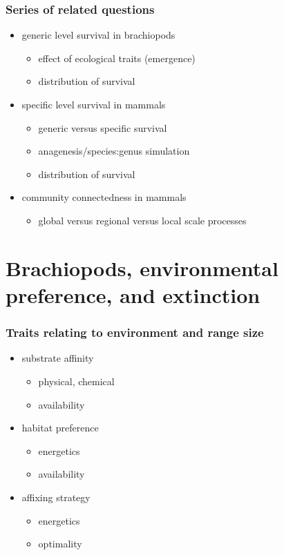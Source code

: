 \documentclass{beamer} \usepackage{amsmath,amsthm}
\begin{document}
\begin{frame}
  \frametitle{Series of related questions}

  \begin{itemize}
    \item generic level survival in brachiopods %
      \begin{itemize}
        \item effect of ecological traits (emergence)
        \item distribution of survival
      \end{itemize}
    \item specific level survival in mammals
      \begin{itemize}
        \item generic versus specific survival
        \item anagenesis/species:genus simulation
        \item distribution of survival
      \end{itemize}
    \item community connectedness in mammals
      \begin{itemize}
        \item global versus regional versus local scale processes
      \end{itemize}
  \end{itemize}
\end{frame}


\section{Brachiopods, environmental preference, and extinction}

\begin{frame}
  \frametitle{Traits relating to environment and range size}

  \begin{itemize}
    \item substrate affinity
      \begin{itemize}
        \item physical, chemical
        \item availability
      \end{itemize}
    \item habitat preference
      \begin{itemize}
        \item energetics
        \item availability
      \end{itemize}
    \item affixing strategy
      \begin{itemize}
        \item energetics
        \item optimality
      \end{itemize}
  \end{itemize}
\end{frame}
\end{document}
